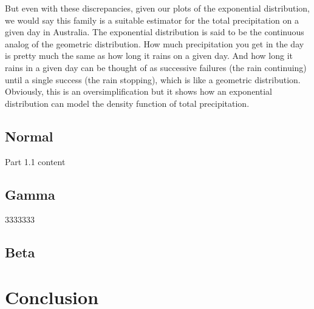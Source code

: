 \documentclass[12pt, a4paper, oneside]{report}
\begin{document}
But even with these discrepancies, given our plots of the exponential distribution, we would say this family is a suitable estimator for the total precipitation on a given day in Australia. The exponential distribution is said to be the continuous analog of the geometric distribution. How much precipitation you get in the day is pretty much the same as how long it rains on a given day. And how long it rains in a given day can be thought of as successive failures (the rain continuing) until a single success (the rain stopping), which is like a geometric distribution. Obviously, this is an oversimplification but it shows how an exponential distribution can model the density function of total precipitation.











\newpage













\section{Normal}
Part 1.1 content
\newpage

\section{Gamma}
3333333
\newpage


\section{Beta}
\newpage


\chapter{Conclusion}
\newpage
\end{document}
